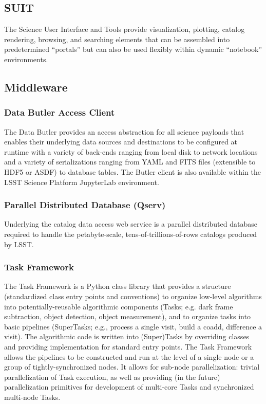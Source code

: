 \documentclass[DM,toc]{lsstdoc}
\begin{document}
\subsection{SUIT}\label{suit}

The Science User Interface and Tools provide visualization, plotting,
catalog rendering, browsing, and searching elements that can be
assembled into predetermined ``portals'' but can also be used flexibly
within dynamic ``notebook'' environments.

\subsection{Middleware}\label{middleware}

\subsubsection{Data Butler Access
Client}\label{data-butler-access-client}

The Data Butler provides an access abstraction for all science payloads
that enables their underlying data sources and destinations to be
configured at runtime with a variety of back-ends ranging from local
disk to network locations and a variety of serializations ranging from
YAML and FITS files (extensible to HDF5 or ASDF) to database tables. The
Butler client is also available within the LSST Science Platform
JupyterLab environment.

\subsubsection{Parallel Distributed Database
(Qserv)}\label{parallel-distributed-database-qserv}

Underlying the catalog data access web service is a parallel distributed
database required to handle the petabyte-scale,
tens-of-trillions-of-rows catalogs produced by LSST.

\subsubsection{Task Framework}\label{task-framework}

The Task Framework is a Python class library that provides a structure
(standardized class entry points and conventions) to organize low-level
algorithms into potentially-reusable algorithmic components (Tasks; e.g.
dark frame subtraction, object detection, object measurement), and to
organize tasks into basic pipelines (SuperTasks; e.g., process a single
visit, build a coadd, difference a visit). The algorithmic code is
written into (Super)Tasks by overriding classes and providing
implementation for standard entry points. The Task Framework allows the
pipelines to be constructed and run at the level of a single node or a
group of tightly-synchronized nodes. It allows for sub-node
parallelization: trivial parallelization of Task execution, as well as
providing (in the future) parallelization primitives for development of
multi-core Tasks and synchronized multi-node Tasks.
\end{document}

